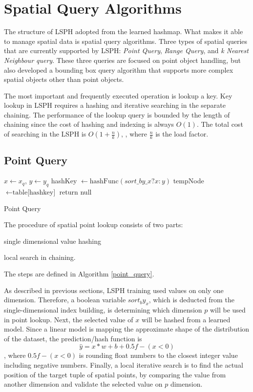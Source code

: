 \section{Spatial Query Algorithms}
The structure of LSPH adopted from the learned hashmap. What makes it able to manage spatial data is spatial query algorithms. Three types of spatial queries that are currently supported by LSPH: \textit{Point Query}, \textit{Range Query}, and \textit{k Nearest Neighbour query}. These three queries are focused on point object handling, but also developed a bounding box query algorithm that supports more complex spatial objects other than point objects.  

The most important and frequently executed operation is lookup a key. Key lookup in LSPH requires a hashing and iterative searching in the separate chaining. The performance of the lookup query is bounded by the length of chaining since the cost of hashing and indexing is always $O(1)$. The total cost of searching in the LSPH is $O(1 + \frac{n}{k})$, , where $\frac{n}{k}$ is the load factor. 

\subsection{Point Query}
\begin{algorithm}[H] \label{point_query}
\SetAlgoLined
{}
 $x\leftarrow{x_q}$, $y\leftarrow{y_q}$\;
 hashKey $\leftarrow{\text{hashFunc}(sort\_by\_x ? x : y)}$\;
 tempNode $\leftarrow{\text{table[hashkey]}}$\;
 return null\;
 \caption{Point Query}
\end{algorithm}

The procedure of spatial point lookup consists of two parts: 
\begin{enumerate*}
    \item single dimensional value hashing
    \item local search in chaining.
\end{enumerate*}
 The steps are defined in Algorithm \ref{point_query}.

As described in previous sections, LSPH training used values on only one dimension. Therefore, a boolean variable $sort_by_x$, which is deducted from the single-dimensional index building,  is determining which dimension $p$ will be used in point lookup. Next, the selected value of $x$ will be hashed from a learned model. Since a linear model is mapping the approximate shape of the distribution of the dataset, the prediction/hash function is 
\begin{equation}
\hat{y} = x * w + b + 0.5f - (x<0)
\end{equation}
, where $0.5f - (x<0)$ is rounding float numbers to the closest integer value including negative numbers. Finally, a local iterative search is to find the actual position of the target tuple of spatial points, by comparing the value from another dimension and validate the selected value on $p$ dimension. 

